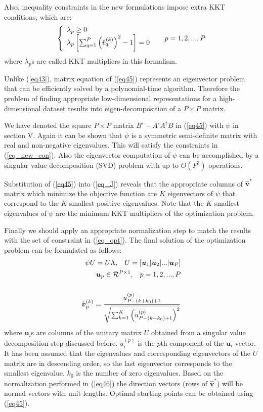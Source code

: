 \documentclass[10pt,journal,cspaper,compsoc]{IEEEtran}
\begin{document}
Also, inequality constraints in the new formulations impose extra KKT conditions, which are:
\begin{equation}
\label{eq_new_con}
\left\{
\begin{array}{l l}
\lambda_p\ge0 \\
\lambda_p\left[\sum_{q=1}^{P}\left(\hat{v}_q^{(k)}\right)^2-1\right]=0
\end{array} \right.\
\quad p=1,2,...,P
\end{equation}
where $\lambda_p$s are called KKT multipliers in this formalism.

Unlike (\ref{eq43}), matrix equation of (\ref{eq45}) represents an eigenvector problem that can be efficiently solved by a polynomial-time algorithm. Therefore the problem of finding appropriate low-dimensional representations for a high-dimensional dataset results into eigen-decomposition of a $P\times P$ matrix.

We have denoted the square $P\times P$ matrix $B'-A'A^{\dagger}B$ in (\ref{eq45}) with $\psi$ in section V. Again it can be shown that $\psi$ is a symmetric semi-definite matrix with real and non-negative eigenvalues. This will satisfy the constraints in (\ref{eq_new_con}). Also the eigenvector computation of $\psi$ can be accomplished by a singular value decomposition (SVD) problem with up to $O(P^3)$ operations.
 
Substitution of (\ref{eq45}) into (\ref{eq_J}) reveals that the appropriate columns of $\hat{\boldsymbol{v}}^*$ matrix which minimize the objective function are $K$ eigenvectors of $\psi$ that correspond to the $K$ smallest positive eigenvalues. Note that the $K$ smallest eigenvalues of $\psi$ are the minimum KKT multipliers of the optimization problem. 

Finally we should apply an appropriate normalization step to match the results with the set of constraint in (\ref{eq_opt}). The final solution of the optimization problem can be formulated as follows:
\begin{align}
\label{eq46}
\psi{U}=U{\Lambda}, \hspace{3mm} U=\left[\boldsymbol{u}_1|\boldsymbol{u}_2|...|\boldsymbol{u}_P\right]
\nonumber \\
\boldsymbol{u}_p\in \mathcal{R}^{P\times 1}, \hspace{3mm} p=1,2,...,P
\nonumber \\
\nonumber \\
\hat{\boldsymbol{v}}^{(k)}_p=\frac{u^{(p)}_{P-\left(k+k_0\right)+1}}{\sqrt{\sum_{k=1}^{K}\left(u^{(p)}_{P-\left(k+k_0\right)+1}\right)^2}}
\end{align}
where $\boldsymbol{u}_i$s are columns of the unitary matrix $U$ obtained from a singular value decomposition step discussed before. $u_i^{(p)}$ is the $p$th component of the $\boldsymbol{u}_i$ vector. It has been assumed that the eigenvalues and corresponding eigenvectors of the $U$ matrix are in descending order, so the last eigenvector corresponds to the smallest eigenvalue. $k_0$ is the number of zero eigenvalues. Based on the normalization performed in (\ref{eq46}) the direction vectors (rows of $\hat{\boldsymbol{v}}^*$) will be normal vectors with unit lengths. Optimal starting points can be obtained using (\ref{eq45}).
\end{document}
